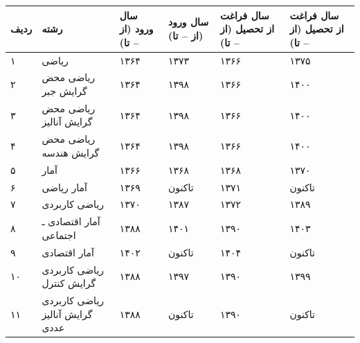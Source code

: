 \documentclass[
  letterpaper,
  DIV=11,
  numbers=noendperiod]{scrreprt}
\newcounter{none} %
\begin{document}
{\def\LTcaptype{none} %
\begin{longtable}[]{@{}
  >{\raggedright\arraybackslash}p{}
  >{\raggedright\arraybackslash}p{}
  >{\raggedright\arraybackslash}p{}
  >{\raggedright\arraybackslash}p{}
  >{\raggedright\arraybackslash}p{}
  >{\raggedright\arraybackslash}p{}@{}}
\toprule\noalign{}
\begin{minipage}[b]{\linewidth}\raggedright
ردیف
\end{minipage} & \begin{minipage}[b]{\linewidth}\raggedright
رشته
\end{minipage} & \begin{minipage}[b]{\linewidth}\raggedright
سال ورود (از -- تا)
\end{minipage} & \begin{minipage}[b]{\linewidth}\raggedright
سال ورود (از -- تا)
\end{minipage} & \begin{minipage}[b]{\linewidth}\raggedright
سال فراغت از تحصیل (از -- تا)
\end{minipage} & \begin{minipage}[b]{\linewidth}\raggedright
سال فراغت از تحصیل (از -- تا)
\end{minipage} \\
\midrule\noalign{}
\endhead
\bottomrule\noalign{}
\endlastfoot
۱ & ریاضی & ۱۳۶۴ & ۱۳۷۳ & ۱۳۶۶ & ۱۳۷۵ \\
۲ & ریاضی محض گرایش جبر & ۱۳۶۴ & ۱۳۹۸ & ۱۳۶۶ & ۱۴۰۰ \\
۳ & ریاضی محض گرایش آنالیز & ۱۳۶۴ & ۱۳۹۸ & ۱۳۶۶ & ۱۴۰۰ \\
۴ & ریاضی محض گرایش هندسه & ۱۳۶۴ & ۱۳۹۸ & ۱۳۶۶ & ۱۴۰۰ \\
۵ & آمار & ۱۳۶۶ & ۱۳۶۸ & ۱۳۶۸ & ۱۳۷۰ \\
۶ & آمار ریاضی & ۱۳۶۹ & تاکنون & ۱۳۷۱ & تاکنون \\
۷ & ریاضی کاربردی & ۱۳۷۰ & ۱۳۸۷ & ۱۳۷۲ & ۱۳۸۹ \\
۸ & آمار اقتصادی ـ اجتماعی & ۱۳۸۸ & ۱۴۰۱ & ۱۳۹۰ & ۱۴۰۳ \\
۹ & آمار اقتصادی & ۱۴۰۲ & تاکنون & ۱۴۰۴ & تاکنون \\
۱۰ & ریاضی کاربردی گرایش کنترل & ۱۳۸۸ & ۱۳۹۷ & ۱۳۹۰ & ۱۳۹۹ \\
۱۱ & ریاضی کاربردی گرایش آنالیز عددی & ۱۳۸۸ & تاکنون & ۱۳۹۰ & تاکنون \\

\end{longtable}}
\end{document}
